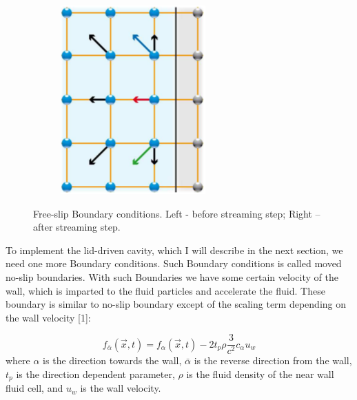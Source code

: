 \begin{figure}[H]
\begin{subfigure}[h]{0.3\textwidth}
    \includegraphics[width=\textwidth]{img/fig9-2.png}
  \end{subfigure}
  \caption{Free-slip Boundary conditions. Left - before streaming step; Right – after streaming step.}
\end{figure}

To implement the lid-driven cavity, which I will describe in the next section, we need one more Boundary conditions. Such Boundary conditions is called moved no-slip boundaries. With such Boundaries we have some certain velocity of the wall, which is imparted to the fluid particles and accelerate the fluid. These boundary is similar to no-slip boundary except of the scaling term depending on the wall velocity [1]:

\begin{equation}
f_{\bar{\alpha}}(\vec{x},t) = f_{\alpha}(\vec{x},t) - 2 t_p \rho \frac{3}{c^2} c_{\alpha} u_{w}
\end{equation}
where $\alpha$ is the direction towards the wall, $\bar{\alpha}$ is the reverse direction from the wall, $t_p$ is the direction dependent parameter, $\rho$ is the fluid density of the near wall fluid cell, and $u_w$ is the wall velocity.
